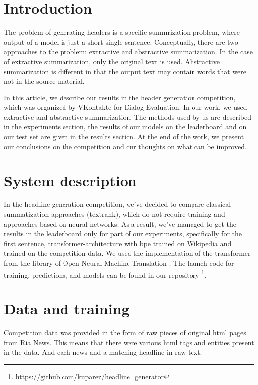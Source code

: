 \documentclass{dialogue}
\begin{document}

\section{Introduction}
The problem of generating headers is a specific summrization problem, where output of a model is just a short single sentence. Conceptually, there are two approaches to the problem: extractive and abstractive summarization. In the case of extractive summarization, only the original text is used. Abstractive summarization is different in that the output text may contain words that were not in the source material.

In this article, we describe our results in the header generation competition, which was organized by VKontakte for Dialog Evaluation. In our work, we used extractive and abstractive summarization. The methods used by us are described in the experiments section, the results of our models on the leaderboard and on our test set are given in the results section. At the end of the work, we present our conclusions on the competition and our thoughts on what can be improved.

\section{System description}
In the headline generation competition, we've decided to compare classical summatization approaches (textrank), which do not require training and approaches based on neural networks. As a result, we've managed to get the results in the leaderboard only for part of our experiments, specifically for the first sentence, transformer-architecture \cite{DBLP:journals/corr/VaswaniSPUJGKP17} with bpe trained on Wikipedia \cite{heinzerling2018bpemb} and trained on the competition data. We used the implementation of the transformer from the library of Open Neural Machine Translation \cite{2017opennmt}. The launch code for training, predictions, and models can be found in our repository \footnote{https://github.com/kuparez/headline\_generator}.

\section{Data and training}
Competition data was provided in the form of raw pieces of original html pages from Ria News. This means that there were various html tags and entities present in the data. And each news and a matching headline in raw text.
\end{document}
